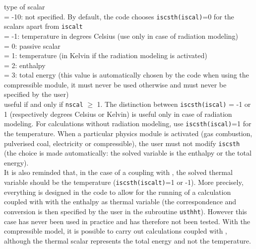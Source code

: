 {type of scalar\\
\hspace*{1.3cm}= -10: not specified. By default, the code chooses
{\tt iscsth(iscal)}=0 for the scalars apart from {\tt iscalt}\\
\hspace*{1.3cm}= -1: temperature in degrees Celsius (use only in case of
radiation modeling)\\
\hspace*{1.3cm}= 0: passive scalar\\
\hspace*{1.3cm}= 1: temperature (in Kelvin if the radiation modeling is
activated)\\
\hspace*{1.3cm}= 2: enthalpy\\
\hspace*{1.3cm}= 3: total energy (this value is automatically chosen by the code
when using the compressible module, it must never be used otherwise and must
never be specified by the user)\\
useful if and only if {\tt nscal} $\geqslant$ 1. The distinction between
{\tt iscsth(iscal)} = -1 or 1 (respectively degrees Celsius or Kelvin) is
useful only in case of radiation modeling. For calculations without
radiation modeling, use {\tt iscsth(iscal)}=1 for the temperature. When a
particular physics module is activated (gas combustion, pulverised coal,
electricity or compressible), the user must not modify {\tt iscsth} (the choice
is made automatically: the solved variable is the enthalpy or the total energy).\\
It is also reminded that, in the case of a coupling with
\syrthes, the solved thermal variable should be the temperature
({\tt iscsth(iscalt)}=1 or -1).
More precisely, everything is designed in the code to allow for the
running of a calculation coupled with \syrthes with the enthalpy as thermal
variable (the correspondence and conversion is then specified by the user in
the subroutine \texttt{usthht}).
However this case has never been used in practice and has therefore not been
tested. With the compressible model, it is possible to carry out calculations
coupled with \syrthes, although the thermal scalar represents the total
energy and not the temperature.}

